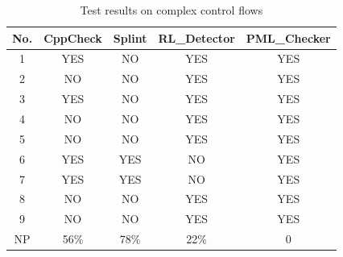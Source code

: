 \begin{table}[!h]
\center
\caption{Test results on complex control flows}\label{tab:2}
\begin{tabular}{|c|c|c|c|c|}
\hline
\textbf{No.}  & \textbf{CppCheck} & \textbf{Splint} & \textbf{RL\_Detector} & \textbf{PML\_Checker}\\
\hline
1	 &	YES & NO & YES & YES\\
\hline
2	 & NO &	NO & YES & YES\\
\hline
3    & YES & NO & YES & YES\\
\hline
4	 & NO & NO & YES & YES\\
\hline
5	 &	NO	& NO & YES & YES\\
\hline
6	 & YES & YES & NO & YES\\
\hline
7	 & YES& YES & NO & YES\\
\hline
8	 & NO & NO & YES & YES\\
\hline
9 & NO & NO & YES & YES\\
\hline
NP & 56\% & 78\% & 22\% & 0\\
\hline
\end{tabular}
\end{table}



